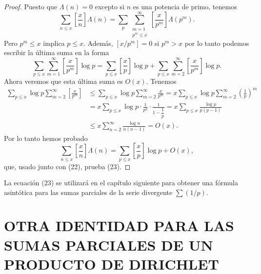 \documentclass[12pt,a4paper]{book}
\begin{document}
    \begin{proof}
        Puesto que $\Lambda(n)=0$ excepto si $n$ es una potencia de primo, tenemos
        \begin{equation*}
            \sum_{n\leq x}\left[\frac{x}{n}\right]\Lambda(n)
            =\sum_{p}\sum_{\substack{m=1\\ p^m\leq x}}^{\infty}\left[\frac{x}{p^m}\right]\Lambda(p^m).
        \end{equation*}
        Pero $p^m\leq x$ implica $p\leq x$. Además, $[x/p^m]=0$ si $p^m>x$ por lo tanto
        podemos escribir la última suma en la forma
        \begin{equation*}
            \sum_{p\leq x}\sum_{m=1}^{\infty}\left[\frac{x}{p^m}\right]\log p
            =\sum_{p\leq x}\left[\frac{x}{p}\right]\log p
            +\sum_{p\leq x}\sum_{m=2}^{\infty}\left[\frac{x}{p^m}\right]\log p.
        \end{equation*}
        Ahora veremos que esta última suma es $O(x)$. Tenemos
        \begin{align*}
            \sum_{p\leq x}\log p\sum_{m=2}^{\infty}\left[\frac{x}{p^m}\right]
            &\leq\sum_{p\leq x}\log p\sum_{m=2}^{\infty}\frac{x}{p^m}
            =x\sum_{p\leq x}\log p\sum_{m=2}^{\infty}\left(\frac{1}{p}\right)^m\\
            &=x\sum_{p\leq x}\log p\cdot\frac{1}{p^2}\cdot\frac{1}{1-\dfrac{1}{p}}
            =x\sum_{p\leq x}\frac{\log p}{p(p-1)}\\
            &\leq x\sum_{n=2}^{\infty}\frac{\log n}{n(n-1)}=O(x).
        \end{align*}
        Por lo tanto hemos probado
        \begin{equation*}
            \sum_{n\leq x}\left[\frac{x}{n}\right]\Lambda(n)=\sum_{p\leq x}\left[\frac{x}{p}\right]\log p+O(x),
        \end{equation*}
        que, usado junto con (22), prueba (23).
    \end{proof}

    La ecuación (23) se utilizará en el capítulo siguiente para obtener una fórmula
    asintótica para las sumas parciales de la serie divergente $\sum(1/p)$.

    \section[OTRA IDENTIDAD PARA LAS SUMAS PARCIALES]{OTRA IDENTIDAD PARA LAS SUMAS PARCIALES DE UN PRODUCTO DE DIRICHLET}
\end{document}
